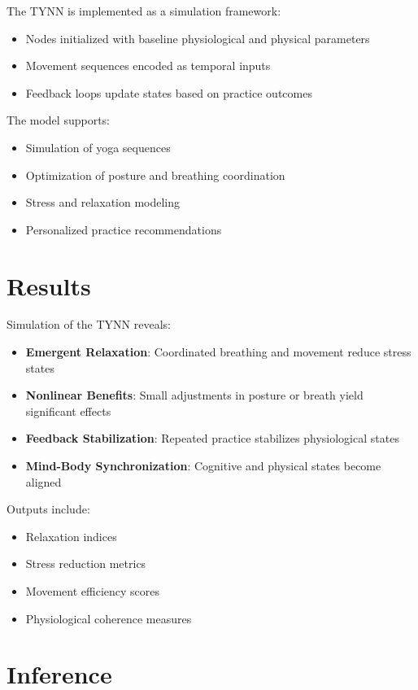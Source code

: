\documentclass[12pt]{article}
\begin{document}
The TYNN is implemented as a simulation framework:

\begin{itemize}
\item Nodes initialized with baseline physiological and physical parameters
\item Movement sequences encoded as temporal inputs
\item Feedback loops update states based on practice outcomes
\end{itemize}

The model supports:

\begin{itemize}
\item Simulation of yoga sequences
\item Optimization of posture and breathing coordination
\item Stress and relaxation modeling
\item Personalized practice recommendations
\end{itemize}

\section{Results}

Simulation of the TYNN reveals:

\begin{itemize}
\item \textbf{Emergent Relaxation}: Coordinated breathing and movement reduce stress states
\item \textbf{Nonlinear Benefits}: Small adjustments in posture or breath yield significant effects
\item \textbf{Feedback Stabilization}: Repeated practice stabilizes physiological states
\item \textbf{Mind-Body Synchronization}: Cognitive and physical states become aligned
\end{itemize}

Outputs include:

\begin{itemize}
\item Relaxation indices
\item Stress reduction metrics
\item Movement efficiency scores
\item Physiological coherence measures
\end{itemize}

\section{Inference}
\end{document}
